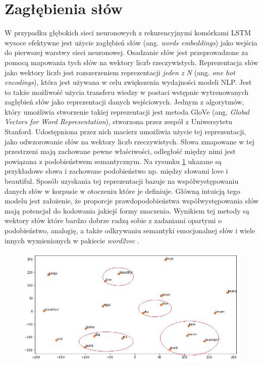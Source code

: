 \section{Zagłębienia słów}
\label{section:words_embeddings}

W przypadku głębokich sieci neuronowych z rekurencyjnymi komórkami LSTM wysoce efektywne jest użycie zagłębień słów (ang. \textit{words embeddings}) jako wejścia do pierwszej warstwy sieci neuronowej. Osadzanie słów jest przeprowadzone za pomocą mapowania tych słów na wektory liczb rzeczywistych. Reprezentacja słów jako wektory liczb jest rozszerzeniem reprezentacji \textit{jeden z N} (ang. \textit{one hot encodings}), która jest używana w celu zwiększenia wydajności modeli NLP. Jest to także możliwość użycia transferu wiedzy w postaci wstępnie wytrenowanych zagłębień słów jako reprezentacji danych wejściowych. Jednym z algorytmów, który umożliwia stworzenie takiej reprezentacji jest metoda GloVe  \cite{brochier2019global} (ang. \textit{Global Vectors for Word Representation}), stworzona przez zespół z Uniwersytetu Stanford. Udostępniona przez nich macierz umożliwia użycie tej reprezentacji, jako odwzorowanie słów na wektory liczb rzeczywistych. Słowa zmapowane w tej przestrzeni mają zachowane pewne właściwości, odległość między nimi jest powiązana z podobieństwem semantycznym. Na rysunku \ref{rys:visualize_glove} ukazane są przykładowe słowa i zachowane podobieństwo np. między słowami love i beautiful. Sposób uzyskania tej reprezentacji bazuje na współwystępowaniu danych słów w korpusie w otoczeniu które je definiuje. Główną intuicją tego modelu jest założenie, że proporcje prawdopodobieństwa współwystępowania słów mają potencjał do kodowania jakiejś formy znaczenia. Wynikiem tej metody są wektory słów które bardzo dobrze radzą sobie z zadaniami opartymi o podobieństwo, analogię, a także odkrywaniu semantyki emocjonalnej słów i wiele innych wymienionych w pakiecie \textit{word2vec} \cite{mikolov2013efficient}.

\begin{figure}[t]
\centering\includegraphics[width=\textwidth]{figures/visualize_glove.png}
\label{rys:visualize_glove}
\end{figure}

